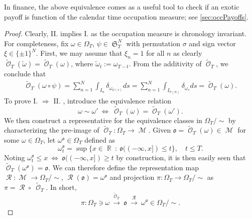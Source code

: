 \documentclass[11pt]{article}
\def\mo{\mathfrak{o}}
\theoremstyle{plain}
\theoremstyle{definition}
\DeclareMathOperator{\R}{\mathbb{R}}
\DeclareMathOperator{\calM}{\mathcal{M}}
\DeclareMathOperator{\calO}{\mathcal{O}}
\DeclareMathOperator{\calR}{\mathcal{R}}
\DeclareMathOperator{\frakS}{\mathfrak{S}}
\begin{document}
In finance, the above equivalence  comes as  a useful tool to check if an exotic payoff is function of the calendar time occupation measure; see  \cref{sec:occPayoffs}.


\begin{proof} 
Clearly,  II. implies I. as the occupation measure is chronology invariant. For completeness,  fix $\omega \in \Omega_T$,  $\psi \in \frakS_T^N$ with permutation $\sigma$ and sign vector $\xi\in \{\pm 1\}^{N}$. First, we may assume that $\xi_n=1$ for all $n$ as clearly $\tilde{\calO}_T(\overleftarrow{\omega})=\tilde{\calO}_T(\omega)$, where $\overleftarrow{\omega}_t:= \omega_{T-t}$. From the additivity of $\tilde{\calO}_T$, we conclude that 
\begin{align*}
    \tilde{\calO}_T(\omega \circ \psi) = \sum_{n=1}^N  \int_{I_n} \delta_{\omega_{\psi(s)}} ds 
             = \sum_{n=1}^N  \int_{I_{\sigma(n)}} \! \delta_{\omega_s} ds  
             = \tilde{\calO}_T(\omega).
\end{align*} 
To prove I. $ \Longrightarrow $ II. ,  introduce the equivalence relation 
$$\omega \sim \omega' \ \Longleftrightarrow \  \tilde{\calO}_T(\omega) = \tilde{\calO}_T(\omega').$$ 
We then construct a  representative for the equivalence classes in $\Omega_T /\! \sim$ by characterizing the pre-image of $\tilde{\calO}_T:\Omega_T \to \calM$. 
Given $\mo = \tilde{\calO}_T(\omega)\in  \calM$ for some $\omega\in \Omega_T$, let  $\omega^{\mo}\in \Omega_T$ defined as 
\begin{equation}
  \omega_t^{\mo} = \sup\{x\in \R \ : \ \mo((-\infty,x]) \le t\}, \quad t \le T. 
\end{equation}
Noting  $ \omega^{\mo}_t\le x \ \Longleftrightarrow \ \mo((-\infty,x]) \ge t$ by construction, it is then easily seen that $\tilde{\calO}_T(\omega^{\mo}) = \mo$. 
We can therefore define the representation map 
$\calR:\calM \to \Omega_T/ \! \sim$, $\calR(\mo) = \omega^{\mo}$ and 
projection $\pi: \Omega_T \to  \Omega_T /\!  \sim$ as $\pi = \calR \circ \ \tilde{\calO}_T$. In short, 
$$ \pi: \Omega_T \ni \omega \ \overset{\tilde{\calO}_T}{\longrightarrow} \   \mo \ \overset{\calR}{\longrightarrow} \  \omega^{\mo} \in \Omega_T / \! \sim. $$


\end{proof}
\end{document}
